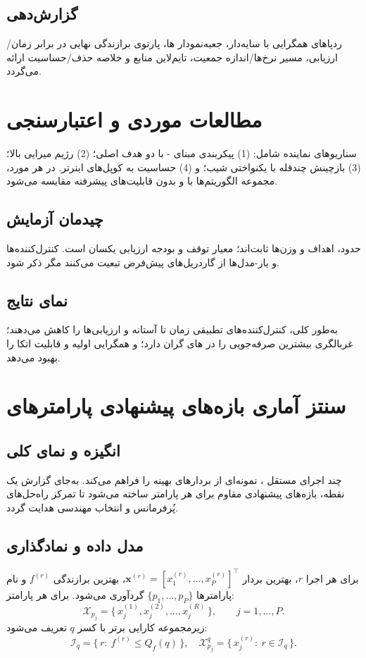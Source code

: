 \subsection{گزارش‌دهی}
ردپاهای همگرایی با  سایه‌دار، جعبه‌نمودار ‌ها، پارتوی برازندگی نهایی در برابر زمان/ارزیابی، مسیر نرخ‌ها/اندازه جمعیت، تایم‌لاین منابع و خلاصه حذف/حساسیت ارائه می‌گردد.

\section{مطالعات موردی و اعتبارسنجی}
\label{sec:case-studies}
سناریوهای نماینده شامل: (1) پیکربندی مبنای - با دو هدف اصلی؛ (2) رژیم میرایی بالا؛ (3) بازچینش چندقله با یکنواختی شیب؛ و (4) حساسیت به کوپل‌های اینرتر. در هر مورد، مجموعه الگوریتم‌ها با و بدون قابلیت‌های پیشرفته مقایسه می‌شود.

\subsection{چیدمان آزمایش}
حدود، اهداف و وزن‌ها ثابت‌اند؛ معیار توقف و بودجه ارزیابی یکسان است. کنترل‌کننده‌ها و یار-مدل‌ها از گاردریل‌های پیش‌فرض تبعیت می‌کنند مگر ذکر شود.

\subsection{نمای نتایج}
به‌طور کلی، کنترل‌کننده‌های تطبیقی زمان تا آستانه و ارزیابی‌ها را کاهش می‌دهند؛ غربالگری بیشترین صرفه‌جویی را در ‌های گران دارد؛ و  همگرایی اولیه و قابلیت اتکا را بهبود می‌دهد.

\section{سنتز آماری بازه‌های پیشنهادی پارامترهای }
\label{sec:statistical-ranges}
\subsection{انگیزه و نمای کلی}
چند اجرای مستقل ، نمونه‌ای از بردارهای بهینه را فراهم می‌کند. به‌جای گزارش یک نقطه، بازه‌های پیشنهادی مقاوم برای هر پارامتر ساخته می‌شود تا تمرکز راه‌حل‌های پُرفرمانس و انتخاب مهندسی هدایت گردد.

\subsection{مدل داده و نمادگذاری}
برای هر اجرا $r$، بهترین بردار $\mathbf{x}^{(r)}=[x^{(r)}_1,\dots,x^{(r)}_P]^{\top}$، بهترین برازندگی $f^{(r)}$ و نام پارامترها $\{p_1,\dots,p_P\}$ گردآوری می‌شود. برای هر پارامتر:
\begin{equation}
 \mathcal{X}_{p_j} = \{\, x^{(1)}_j, x^{(2)}_j, \dots, x^{(R)}_j \,\},\qquad j=1,\dots,P.
\end{equation}
زیرمجموعه کارایی برتر با کسر $q$ تعریف می‌شود:
\begin{equation}
 \mathcal{I}_{q} = \{\, r:\ f^{(r)} \leq Q_f(q) \,\},\quad \mathcal{X}^{q}_{p_j}=\{\, x^{(r)}_j:\ r\in \mathcal{I}_{q}\,\}.
\end{equation}


